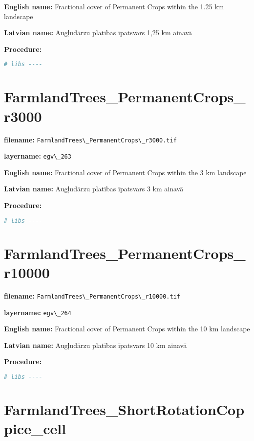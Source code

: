 \documentclass[
]{book}
\newcommand{\passthrough}[1]{#1}
\begin{document}
\textbf{English name:} Fractional cover of Permanent Crops within the 1.25 km landscape

\textbf{Latvian name:} Augļudārzu platības īpatsvars 1,25 km ainavā

\textbf{Procedure:}

\begin{lstlisting}[language=R]
# libs ----
\end{lstlisting}

\section{FarmlandTrees\_PermanentCrops\_r3000}\label{ch06.263}

\textbf{filename:} \passthrough{\lstinline!FarmlandTrees\_PermanentCrops\_r3000.tif!}

\textbf{layername:} \passthrough{\lstinline!egv\_263!}

\textbf{English name:} Fractional cover of Permanent Crops within the 3 km landscape

\textbf{Latvian name:} Augļudārzu platības īpatsvars 3 km ainavā

\textbf{Procedure:}

\begin{lstlisting}[language=R]
# libs ----
\end{lstlisting}

\section{FarmlandTrees\_PermanentCrops\_r10000}\label{ch06.264}

\textbf{filename:} \passthrough{\lstinline!FarmlandTrees\_PermanentCrops\_r10000.tif!}

\textbf{layername:} \passthrough{\lstinline!egv\_264!}

\textbf{English name:} Fractional cover of Permanent Crops within the 10 km landscape

\textbf{Latvian name:} Augļudārzu platības īpatsvars 10 km ainavā

\textbf{Procedure:}

\begin{lstlisting}[language=R]
# libs ----
\end{lstlisting}

\section{FarmlandTrees\_ShortRotationCoppice\_cell}\label{ch06.265}
\end{document}
